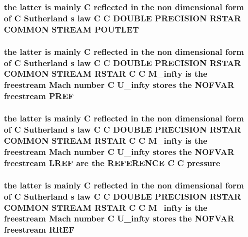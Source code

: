 \hypertarget{stream_8com_a42c20c83e2242ab14c0d4178f49679c8}{
\subsubsection[{P\-O\-U\-T\-L\-E\-T}]{\setlength{\rightskip}{0pt plus 5cm}the latter is mainly C reflected in the non dimensional form of C Sutherland s law C C D\-O\-U\-B\-L\-E P\-R\-E\-C\-I\-S\-I\-O\-N R\-S\-T\-A\-R C\-O\-M\-M\-O\-N S\-T\-R\-E\-A\-M P\-O\-U\-T\-L\-E\-T}}\label{stream_8com_a42c20c83e2242ab14c0d4178f49679c8}
\hypertarget{stream_8com_ac527abdf107d6bddcbc6a80631e1ab59}{
\subsubsection[{P\-R\-E\-F}]{\setlength{\rightskip}{0pt plus 5cm}the latter is mainly C reflected in the non dimensional form of C Sutherland s law C C D\-O\-U\-B\-L\-E P\-R\-E\-C\-I\-S\-I\-O\-N R\-S\-T\-A\-R C\-O\-M\-M\-O\-N S\-T\-R\-E\-A\-M R\-S\-T\-A\-R C C {\bf M\-\_\-infty} is the freestream Mach number C {\bf U\-\_\-infty} stores the N\-O\-F\-V\-A\-R freestream P\-R\-E\-F}}\label{stream_8com_ac527abdf107d6bddcbc6a80631e1ab59}
\hypertarget{stream_8com_a0facbcffae9f2ce2b94119850b5fc3d3}{
\subsubsection[{pressure}]{\setlength{\rightskip}{0pt plus 5cm}the latter is mainly C reflected in the non dimensional form of C Sutherland s law C C D\-O\-U\-B\-L\-E P\-R\-E\-C\-I\-S\-I\-O\-N R\-S\-T\-A\-R C\-O\-M\-M\-O\-N S\-T\-R\-E\-A\-M R\-S\-T\-A\-R C C {\bf M\-\_\-infty} is the freestream Mach number C {\bf U\-\_\-infty} stores the N\-O\-F\-V\-A\-R freestream {\bf L\-R\-E\-F} {\bf are} the R\-E\-F\-E\-R\-E\-N\-C\-E C C pressure}}\label{stream_8com_a0facbcffae9f2ce2b94119850b5fc3d3}
\hypertarget{stream_8com_a79112f231fb3da56eef3fc61c1e77bbd}{
\subsubsection[{R\-R\-E\-F}]{\setlength{\rightskip}{0pt plus 5cm}the latter is mainly C reflected in the non dimensional form of C Sutherland s law C C D\-O\-U\-B\-L\-E P\-R\-E\-C\-I\-S\-I\-O\-N R\-S\-T\-A\-R C\-O\-M\-M\-O\-N S\-T\-R\-E\-A\-M R\-S\-T\-A\-R C C {\bf M\-\_\-infty} is the freestream Mach number C {\bf U\-\_\-infty} stores the N\-O\-F\-V\-A\-R freestream R\-R\-E\-F}}\label{stream_8com_a79112f231fb3da56eef3fc61c1e77bbd}
